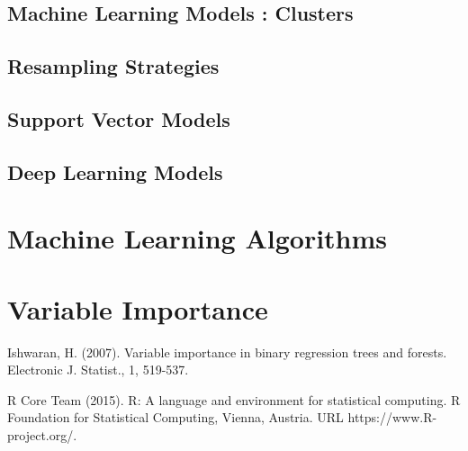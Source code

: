 \begin{thebibliography}{00}
\subsection{Machine Learning Models : Clusters}

\subsection{Resampling Strategies}

\subsection{Support Vector Models}

\subsection{Deep Learning Models}

\section{Machine Learning Algorithms}

\section{Variable Importance}

Ishwaran, H. (2007). 
\newblock Variable importance in binary regression trees and forests. 
\newblock Electronic J. Statist., 1, 519-537.

R Core Team (2015). 
\newblock R: A language and environment for statistical computing. R Foundation for Statistical Computing, Vienna, Austria.
\newblock URL https://www.R-project.org/.

\end{thebibliography}




